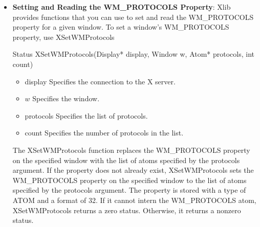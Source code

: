 \documentclass{report}
\begin{document}
\begin{itemize}
\begin{itemize}
            \bigbreak \noindent 
            To read a window’s WM\_TRANSIENT\_FOR property, use XGetTransientForHint
            \bigbreak \noindent 
            \begin{cppcode}
                Status XGetTransientForHint(Display* display, Window w, Window* prop\_window\_return)
            \end{cppcode}
            \bigbreak \noindent
            \begin{itemize}
                \item display Specifies the connection to the X server.
                \item $w$ Specifies the window.
                \item prop\_window\_return Returns the WM\_TRANSIENT\_FOR property of the specified window.
            \end{itemize}
            The XGetTransientForHint function returns the WM\_TRANSIENT\_FOR property for the specified window. It returns a nonzero status on success; otherwise, it returns a zero status.
            \bigbreak \noindent 
            XGetTransientForHint can generate a BadWindow error.
        \item \textbf{Setting and Reading the WM\_PROTOCOLS Property}: Xlib provides functions that you can use to set and read the WM\_PROTOCOLS property for a given window.
            \bigbreak \noindent 
            To set a window’s WM\_PROTOCOLS property, use XSetWMProtocols
            \bigbreak \noindent 
            \begin{cppcode}
                Status XSetWMProtocols(Display* display, Window w, Atom* protocols, int count)
            \end{cppcode}
            \bigbreak \noindent
            \begin{itemize}
                \item display Specifies the connection to the X server.
                \item $w$ Specifies the window.
                \item protocols Specifies the list of protocols.
                \item count Specifies the number of protocols in the list.
            \end{itemize}
            The XSetWMProtocols function replaces the WM\_PROTOCOLS property on the specified window with the list of atoms specified by the protocols argument. If the property does not already exist, XSetWMProtocols sets the WM\_PROTOCOLS property on the specified window to the list of atoms specified by the protocols argument. The property is stored with a type of ATOM and a format of 32. If it cannot intern the WM\_PROTOCOLS atom, XSetWMProtocols returns a zero status. Otherwise, it returns a nonzero status.

\end{itemize}
\end{itemize}
\end{document}
